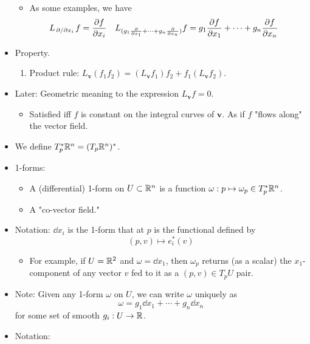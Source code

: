 \documentclass[../notes.tex]{subfiles}
\begin{document}
\begin{itemize}
\begin{itemize}
        \item As some examples, we have
        \begin{align*}
            L_{\pdv*{x_i}}f &= \pdv{f}{x_i}&
            L_{(g_1\pdv{x_1}+\cdots+g_n\pdv{x_n})}f &= g_1\pdv{f}{x_1}+\cdots+g_n\pdv{f}{x_n}
        \end{align*}
    \end{itemize}
    \item Property.
    \begin{enumerate}
        \item Product rule: $L_{\bm{v}}(f_1f_2)=(L_{\bm{v}}f_1)f_2+f_1(L_{\bm{v}}f_2)$.
    \end{enumerate}
    \item Later: Geometric meaning to the expression $L_{\bm{v}}f=0$.
    \begin{itemize}
        \item Satisfied iff $f$ is constant on the integral curves of $\bm{v}$. As if $f$ "flows along" the vector field.
    \end{itemize}
    \item We define $T_p^*\mathbb{R}^n=(T_p\mathbb{R}^n)^*$.
    \item 1-forms:
    \begin{itemize}
        \item A (differential) 1-form on $U\subset\mathbb{R}^n$ is a function $\omega:p\mapsto\omega_p\in T_p^*\mathbb{R}^n$.
        \item A "co-vector field."
    \end{itemize}
    \item Notation: $\dd{x_i}$ is the 1-form that at $p$ is the functional defined by
    \begin{equation*}
        (p,v) \mapsto e_i^*(v)
    \end{equation*}
    \begin{itemize}
        \item For example, if $U=\mathbb{R}^2$ and $\omega=\dd{x_1}$, then $\omega_p$ returns (as a scalar) the $x_1$-component of any vector $v$ fed to it as a $(p,v)\in T_pU$ pair.
    \end{itemize}
    \item Note: Given any 1-form $\omega$ on $U$, we can write $\omega$ uniquely as
    \begin{equation*}
        \omega = g_1\dd{x_1}+\cdots+g_n\dd{x_n}
    \end{equation*}
    for some set of smooth $g_i:U\to\mathbb{R}$.
    \item Notation:
    \begin{itemize}

\end{itemize}
\end{itemize}
\end{document}
